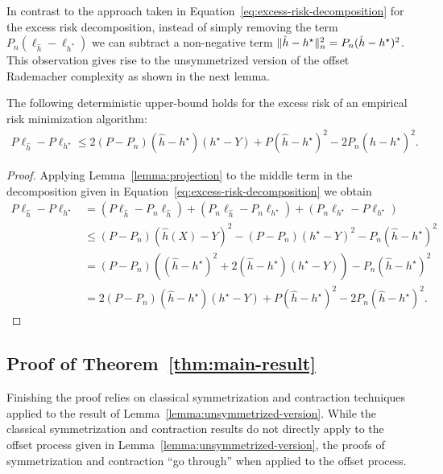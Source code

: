 \documentclass[main.tex]{subfiles}
\begin{document}
In contrast to the approach taken in
Equation~\eqref{eq:excess-risk-decomposition} for the excess risk decomposition,
instead of simply removing the term
$P_{n}(\ell_{\hat{h}} - \ell_{h^{*}})$ we can subtract a non-negative term
$\lVert \hat{h} - h^{\star} \rVert_{n}^{2} = P_{n}(\hat{h} - h^{\star})^{2}$.
This observation gives rise to the unsymmetrized version of the offset
Rademacher complexity as shown in the next lemma.

\begin{lemma}
  \label{lemma:unsymmetrized-version}
  The following deterministic upper-bound holds for the excess risk of an
  empirical risk minimization algorithm:
  \begin{align*}
    P\ell_{\hat{h}} - P\ell_{h^{\star}}
    \leq
    2(P-P_{n})(\hat{h} - h^{\star})(h^{\star} - Y)
    + P(\hat{h} - h^{\star})^{2} - 2P_{n}(\hat{h} - h^{\star})^{2}.
  \end{align*}
\end{lemma}

\begin{proof}
  Applying Lemma~\ref{lemma:projection} to the middle term in the
  decomposition given in Equation~\eqref{eq:excess-risk-decomposition} we
  obtain
  \begin{align*}
    P\ell_{\hat{h}} - P\ell_{h^{\star}}
    &=
    (P\ell_{\hat{h}}
    - P_{n}\ell_{\hat{h}})
    + (P_{n}{\ell_{\hat{h}}}
    - P_{n}{\ell_{h^{\star}}})
    + (P_{n}{\ell_{h^{\star}}}
    - P\ell_{h^{\star}}) \\
    &\leq
    (P-P_{n})(\hat{h}(X) - Y)^{2}
    - (P-P_{n})(h^{\star} - Y)^{2}
    - P_{n}(\hat{h} - h^{\star})^{2} \\
    &= (P-P_{n})((\hat{h} - h^\star)^{2} + 2(\hat{h} - h^{\star})(h^{\star}
    - Y))
    - P_{n}(\hat{h} - h^{\star})^{2} \\
    &= 2(P-P_{n})(\hat{h} - h^{\star})(h^{\star} - Y)
    + P(\hat{h} - h^{\star})^{2} - 2P_{n}(\hat{h} - h^{\star})^{2}.
  \end{align*}
\end{proof}

\subsection{Proof of Theorem~\ref{thm:main-result}}
Finishing the proof relies on classical symmetrization and contraction
techniques applied to the result of Lemma~\ref{lemma:unsymmetrized-version}.
While the classical symmetrization and contraction results do not directly
apply to the offset process given in Lemma~\ref{lemma:unsymmetrized-version},
the proofs of symmetrization and contraction ``go through'' when applied
to the offset process.
\end{document}
